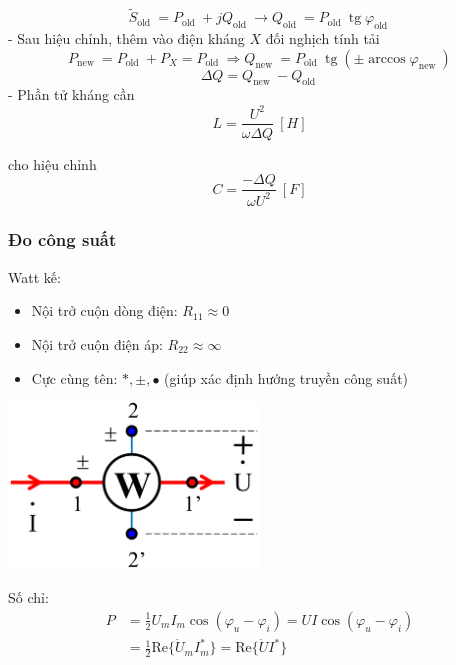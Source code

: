 \begin{equation}
    \tilde{S}_{\text {old }}=P_{\text {old }}+j Q_{\text {old }} \rightarrow Q_{\text {old }}=P_{\text {old }} \operatorname{tg} \varphi_{\text {old }}
\end{equation}
- Sau hiệu chỉnh, thêm vào điện kháng $X$ đối nghịch tính tải \begin{equation}
    P_{\text {new }}=P_{\text {old }}+P_X=P_{\text {old }} \Longrightarrow Q_{\text {new }}=P_{\text {old }} \operatorname{tg}\left( \pm \arccos \varphi_{\text {new }}\right)
\end{equation}
\begin{equation}
    \Delta Q=Q_{\text {new }}-Q_{\text {old }}
\end{equation}
- Phần tử kháng cần
\begin{equation}
    L=\frac{U^2}{\omega \Delta Q} \ [H]
\end{equation}

cho hiệu chỉnh
\begin{equation}
    C=\frac{-\Delta Q}{\omega U^2} \ [F]
\end{equation}
\subsubsection{Đo công suất}
Watt kế:
\begin{itemize}
    \item Nội trở cuộn dòng điện: $R_{11} \approx 0$
    \item Nội trở cuộn điện áp: $R_{22} \approx \infty$
    \item Cực cùng tên: $\ast, \pm, \bullet$ (giúp xác định hướng truyền công suất)
\end{itemize}
\begin{center}
    \includegraphics[width = 0.5\textwidth]{./image/57.png}
\end{center}
Số chỉ:
\begin{equation}
    \begin{aligned}
        P &= \frac{1}{2}U_m I_m\cos(\varphi_u - \varphi_i) = UI\cos (\varphi_u - \varphi_i) \\
          &= \frac{1}{2} \text{Re} \lbrace \dot{U}_m I^*_m \rbrace = \text{Re} \lbrace \dot{U} I^* \rbrace
    \end{aligned}
\end{equation}
